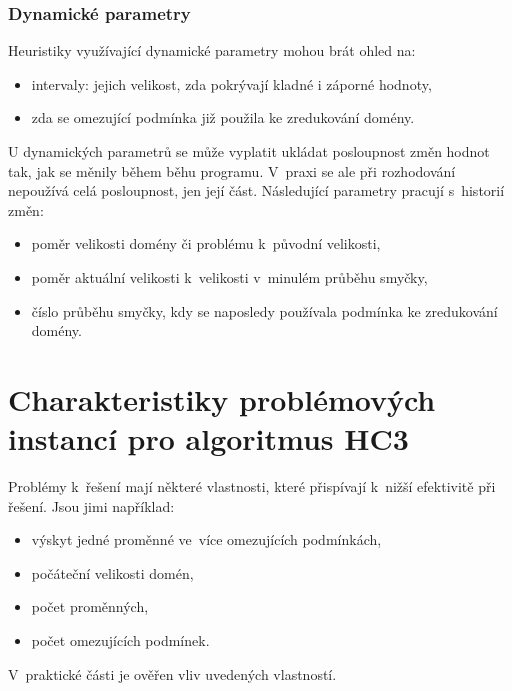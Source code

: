 \subsubsection{Dynamické parametry}

Heuristiky využívající dynamické parametry mohou brát ohled na:

\begin{itemize}
    \item intervaly:
        \subitem jejich velikost,
        \subitem zda pokrývají kladné i záporné hodnoty,
    \item zda se omezující podmínka již použila ke zredukování domény.
\end{itemize}

U dynamických parametrů se může vyplatit ukládat posloupnost změn hodnot tak, jak se měnily během běhu programu. V~praxi se ale při rozhodování nepoužívá celá posloupnost, jen její část. Následující parametry pracují s~historií změn:

\begin{itemize}
  \item poměr velikosti domény či problému k~původní velikosti,
  \item poměr aktuální velikosti k~velikosti v~minulém průběhu smyčky,
  \item číslo průběhu smyčky, kdy se naposledy používala podmínka ke zredukování domény.
\end{itemize}


\section{Charakteristiky problémových instancí pro algoritmus HC3}

Problémy k~řešení mají některé vlastnosti, které přispívají k~nižší efektivitě při řešení. Jsou jimi například:


\begin{itemize}
  \item výskyt jedné proměnné ve~více omezujících podmínkách,
  \item počáteční velikosti domén,
  \item počet proměnných,
  \item počet omezujících podmínek.
\end{itemize}

V~praktické části je ověřen vliv uvedených vlastností.


